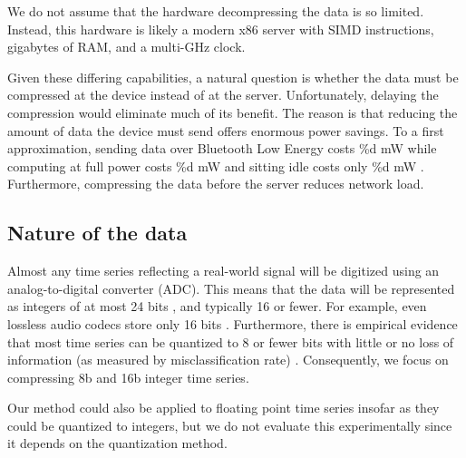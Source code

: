 We do not assume that the hardware decompressing the data is so limited. Instead, this hardware is likely a modern x86 server with SIMD instructions, gigabytes of RAM, and a multi-GHz clock.

Given these differing capabilities, a natural question is whether the data must be compressed at the device instead of at the server. Unfortunately, delaying the compression would eliminate much of its benefit. The reason is that reducing the amount of data the device must send offers enormous power savings. To a first approximation, sending data over Bluetooth Low Energy costs \%d mW while computing at full power costs \%d mW and sitting idle costs only \%d mW \cite{TODO}. Furthermore, compressing the data before the server reduces network load.


\subsection{Nature of the data}

Almost any time series reflecting a real-world signal will be digitized using an analog-to-digital converter (ADC). This means that the data will be represented as integers of at most 24 bits \cite{digikeySearch}, and typically 16 or fewer. For example, even lossless audio codecs store only 16 bits \cite{someAudioCodecs, TODO}. Furthermore, there is empirical evidence that most time series can be quantized to 8 or fewer bits with little or no loss of information (as measured by misclassification rate) \cite{ucrWhateverItWas}. Consequently, we focus on compressing 8b and 16b integer time series. %

Our method could also be applied to floating point time series insofar as they could be quantized to integers, but we do not evaluate this experimentally since it depends on the quantization method.

